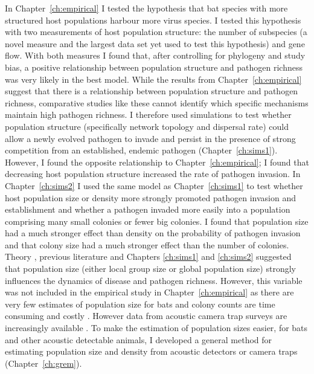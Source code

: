 In Chapter~\ref{ch:empirical} I tested the hypothesis that bat species with more structured host populations harbour more virus species.
I tested this hypothesis with two measurements of host population structure: the number of subspecies (a novel measure and the largest data set yet used to test this hypothesis) and gene flow.
With both measures I found that, after controlling for phylogeny and study bias, a positive relationship between population structure and pathogen richness was very likely in the best model.
While the results from Chapter~\ref{ch:empirical} suggest that there is a relationship between population structure and pathogen richness, comparative studies like these cannot identify which specific mechanisms maintain high pathogen richness.
I therefore used simulations to test whether population structure (specifically network topology and dispersal rate) could allow a newly evolved pathogen to invade and persist in the presence of strong competition from an established, endemic pathogen (Chapter~\ref{ch:sims1}).
However, I found the opposite relationship to Chapter~\ref{ch:empirical}; I found that decreasing host population structure increased the rate of pathogen invasion.
In Chapter~\ref{ch:sims2} I used the same model as Chapter~\ref{ch:sims1} to test whether host population size or density more strongly promoted pathogen invasion and establishment and whether a pathogen invaded more easily into a population comprising many small colonies or fewer big colonies.
I found that population size had a much stronger effect than density on the probability of pathogen invasion and that colony size had a much stronger effect than the number of colonies.
Theory \cite{may1979population, anderson1979population}, previous literature \cite{kamiya2014determines, nunn2003comparative, morand1998density} and Chapters \ref{ch:sims1} and \ref{ch:sims2} suggested that population size (either local group size or global population size) strongly influences the dynamics of disease and pathogen richness.
However, this variable was not included in the empirical study in Chapter~\ref{ch:empirical} as there are very few estimates of population size for bats and colony counts are time consuming and costly \cite{kloepper2016estimating}.
However data from acoustic camera trap surveys are increasingly available \cite{jones2011indicator}.
To make the estimation of population sizes easier, for bats and other acoustic detectable animals, I developed a general method for estimating population size and density from acoustic detectors or camera traps (Chapter~\ref{ch:grem}).



